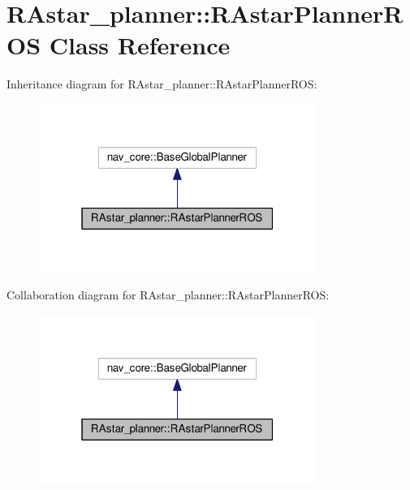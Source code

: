 \hypertarget{class_r_astar__planner_1_1_r_astar_planner_r_o_s}{}\section{R\+Astar\+\_\+planner\+:\+:R\+Astar\+Planner\+R\+OS Class Reference}
\label{class_r_astar__planner_1_1_r_astar_planner_r_o_s}


Inheritance diagram for R\+Astar\+\_\+planner\+:\+:R\+Astar\+Planner\+R\+OS\+:
\nopagebreak
\begin{figure}[H]
\begin{center}
\leavevmode
\includegraphics[width=256pt]{class_r_astar__planner_1_1_r_astar_planner_r_o_s__inherit__graph}
\end{center}
\end{figure}


Collaboration diagram for R\+Astar\+\_\+planner\+:\+:R\+Astar\+Planner\+R\+OS\+:
\nopagebreak
\begin{figure}[H]
\begin{center}
\leavevmode
\includegraphics[width=256pt]{class_r_astar__planner_1_1_r_astar_planner_r_o_s__coll__graph}
\end{center}
\end{figure}
